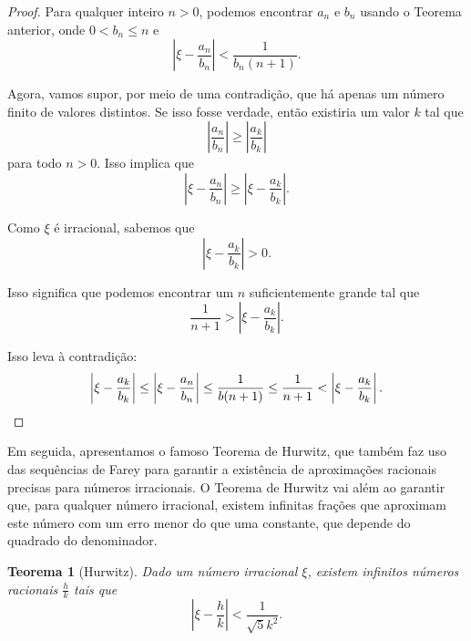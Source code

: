 \documentclass{hipatia}
\newtheorem*{theorem*}{Teorema}
\theoremstyle{definition} %
\begin{document}
\begin{proof}
Para qualquer inteiro \( n > 0 \), podemos encontrar \( a_n \) e \( b_n \) usando o Teorema anterior, onde \( 0 < b_n \leq n \) e %
\[
\left| \xi - \frac{a_n}{b_n} \right| < \frac{1}{b_n(n + 1)}.
\]

Agora, vamos supor, por meio de uma contradição, que há apenas um número finito de valores distintos. Se isso fosse verdade, então existiria um valor \( k \) tal que
\[
\left| \frac{a_n}{b_n} \right| \geq \left| \frac{a_k}{b_k} \right|
\]
para todo \( n > 0 \). Isso implica que
\[
\left| \xi - \frac{a_n}{b_n} \right| \geq \left| \xi - \frac{a_k}{b_k} \right|.
\]

Como \( \xi \) é irracional, sabemos que
\[
\left| \xi - \frac{a_k}{b_k} \right| > 0.
\]

Isso significa que podemos encontrar um \( n \) suficientemente grande tal que
\[
\frac{1}{n + 1} > \left| \xi - \frac{a_k}{b_k} \right|.
\]

Isso leva à contradição:
\[
\left| \xi - \frac{a_k}{b_k} \right| \leq \left| \xi - \frac{a_n}{b_n} \right| \leq \frac{1}{b(n+1)} \leq \frac{1}{n+1} < \left| \xi - \frac{a_k}{b_k} \right|.\qedhere
\]
\end{proof}

Em seguida, apresentamos o famoso Teorema de Hurwitz, que também faz uso das sequências de Farey para garantir a existência de aproximações racionais precisas para números irracionais. O Teorema de Hurwitz vai além ao garantir que, para qualquer número irracional, existem infinitas frações que aproximam este número com um erro menor do que uma constante, que depende do quadrado do denominador. 

\begin{theorem*} [Hurwitz]
Dado um número irracional \(\xi\), existem infinitos números racionais \(\frac{h}{k}\) tais que
\[
\left| \xi - \frac{h}{k} \right| < \frac{1}{\sqrt{5}k^2}.
\]
\end{theorem*}
\end{document}
